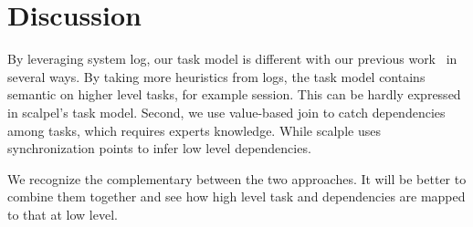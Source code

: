 
\section{Discussion}
\label{sec:discussion}

By leveraging system log, our task model is different with
our previous work~\cite{} in several ways.  By taking more
heuristics from logs, the task model contains semantic on
higher level tasks, for example session.  This can be hardly
expressed in scalpel's task model.  Second, we use
value-based join to catch dependencies among tasks, which
requires experts knowledge. While scalple uses
synchronization points to infer low level dependencies.

We recognize the complementary between the two approaches.
It will be better to combine them together and see how high
level task and dependencies are mapped to that at low level.

